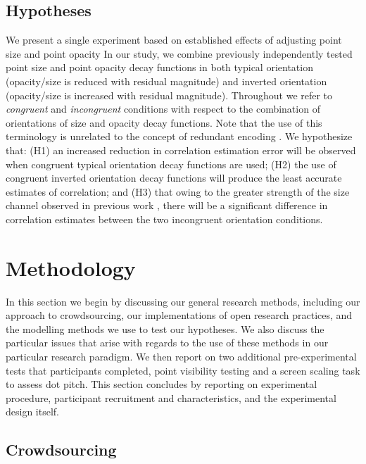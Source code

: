 \documentclass[manuscript, review, anonymous, screen]{acmart}
\begin{document}
\hypertarget{hypotheses}{%
\subsection{Hypotheses}\label{hypotheses}}

We present a single experiment based on established effects of adjusting
point size and point opacity In our study, we combine previously
independently tested point size and point opacity decay functions in
both typical orientation (opacity/size is reduced with residual
magnitude) and inverted orientation (opacity/size is increased with
residual magnitude). Throughout we refer to \emph{congruent} and
\emph{incongruent} conditions with respect to the combination of
orientations of size and opacity decay functions. Note that the use of
this terminology is unrelated to the concept of redundant encoding
\citep{nothelfer_2017}. We hypothesize that: (H1) an increased reduction
in correlation estimation error will be observed when congruent typical
orientation decay functions are used; (H2) the use of congruent inverted
orientation decay functions will produce the least accurate estimates of
correlation; and (H3) that owing to the greater strength of the size
channel observed in previous work \citep{strain_2023b}, there will be a
significant difference in correlation estimates between the two
incongruent orientation conditions.

\hypertarget{sec-methods}{%
\section{Methodology}\label{sec-methods}}

In this section we begin by discussing our general research methods,
including our approach to crowdsourcing, our implementations of open
research practices, and the modelling methods we use to test our
hypotheses. We also discuss the particular issues that arise with
regards to the use of these methods in our particular research paradigm.
We then report on two additional pre-experimental tests that
participants completed, point visibility testing and a screen scaling
task to assess dot pitch. This section concludes by reporting on
experimental procedure, participant recruitment and characteristics, and
the experimental design itself.

\hypertarget{sec-crowdsourcing}{%
\subsection{Crowdsourcing}\label{sec-crowdsourcing}}
\end{document}
